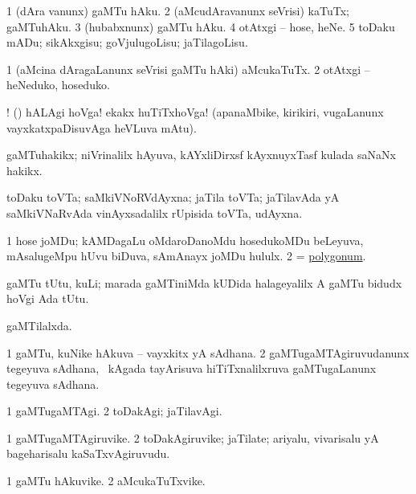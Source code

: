 \noindent
\gl{\sakirx}
\bmng
\bnum
\num{1} (dAra \mo vanunx) gaMTu hAku. 
\num{2} (aMcudAravanunx seVrisi) kaTuTx; gaMTuhAku. 
\num{3} (hubabxnunx) gaMTu hAku. 
\num{4} otAtxgi -- hose, heNe. 
\num{5} toDaku mADu; sikAkxgisu; goVjulugoLisu; jaTilagoLisu. 
\enum
\emng

\noindent
\gl{\akirx}
\bmng
\bnum
\num{1} (aMcina dAragaLanunx seVrisi gaMTu hAki) aMcukaTuTx. 
\num{2} otAtxgi -- heNeduko, hoseduko. 
\enum
\emng

\noindent
\gl{\nuga}
\bmng
{}! (\ashi) hALAgi hoVga! ekakx huTiTxhoVga! (apanaMbike, kirikiri, \mo vugaLanunx vayxkatxpaDisuvAga heVLuva mAtu). 
\emng
\eentry

\bentry
{}
\gl{\nA}
\bmng
gaMTuhakikx; niVrinalilx hAyuva, kAYxliDirxsf kAyxnuyxTasf kulada saNaNx hakikx. 
\emng
\eentry

\bentry
{}
\gl{\nA}
\bmng
toDaku toVTa; saMkiVNoRVdAyxna; jaTila toVTa; jaTilavAda yA saMkiVNaRvAda vinAyxsadalilx rUpisida toVTa, udAyxna. 
\emng
\eentry

\bentry
{}
\gl{\nA}
\bmng
\bnum
\num{1} hose joMDu; kAMDagaLu oMdaroDanoMdu hosedukoMDu beLeyuva, mAsalugeMpu hUvu biDuva, sAmAnayx joMDu hululx. 
\num{2} = \hyperref{kandict_p.pdf}{P}{polygonum}{polygonum}. 
\enum
\emng
\eentry

\bentry
{}
\gl{\nA}
\bmng
gaMTu tUtu, kuLi; marada gaMTiniMda kUDida halageyalilx A gaMTu bidudx hoVgi Ada tUtu. 
\emng
\eentry

\bentry
{}
\gl{\gu}
\bmng
gaMTilalxda. 
\emng
\eentry

\bentry
{}
\gl{\nA}
\bmng
\bnum
\num{1} gaMTu, kuNike hAkuva -- vayxkitx yA sAdhana. 
\num{2} gaMTugaMTAgiruvudanunx tegeyuva sAdhana, \udA\ kAgada tayArisuva hiTiTxnalilxruva gaMTugaLanunx tegeyuva sAdhana. 
\enum
\emng
\eentry

\bentry
{}
\gl{\kirxvi}
\bmng
\bnum
\num{1} gaMTugaMTAgi. 
\num{2} toDakAgi; jaTilavAgi. 
\enum
\emng
\eentry

\bentry
{}
\gl{\nA}
\bmng
\bnum
\num{1} gaMTugaMTAgiruvike. 
\num{2} toDakAgiruvike; jaTilate; ariyalu, vivarisalu yA bageharisalu kaSaTxvAgiruvudu. 
\enum
\emng
\eentry

\bentry
{}
\gl{\nA}
\bmng
\bnum
\num{1} gaMTu hAkuvike. 
\num{2} aMcukaTuTxvike. 
\enum
\emng
\eentry

